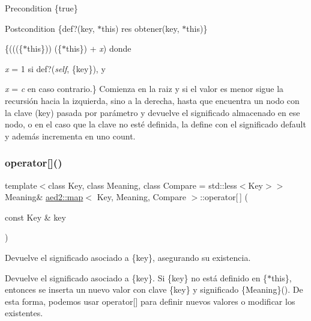 \begin{DoxyPrecond}{Precondition}
\{true\} 
\end{DoxyPrecond}
\begin{DoxyPostcond}{Postcondition}
\{def?(key, $\ast$this)  res  obtener(key, $\ast$this)\}
\end{DoxyPostcond}
\{(((\{$\ast$this\}))  (\{$\ast$this\}) + {\itshape x}) donde
\begin{DoxyItemize}
\item {\itshape x} = 1 si def?({\itshape self}, \{key\}), y
\item {\itshape x} = {\itshape c} en caso contrario.\} Comienza en la raiz y si el valor es menor sigue la recursión hacia la izquierda, sino a la derecha, hasta que encuentra un nodo con la clave (key) pasada por parámetro y devuelve el significado almacenado en ese nodo, o en el caso que la clave no esté definida, la define con el significado default y además incrementa en uno count. 
\end{DoxyItemize}\mbox{\label{classaed2_1_1map_a96f23896164ab47bee48c26b803f9801}} 
\subsubsection{\texorpdfstring{operator[]()}{operator[]()}\hspace{0.1cm}{\footnotesize\ttfamily [2/2]}}
{\footnotesize\ttfamily template$<$class Key, class Meaning, class Compare = std\+::less$<$\+Key$>$$>$ \\
Meaning\& \hyperlink{classaed2_1_1map}{aed2\+::map}$<$ Key, Meaning, Compare $>$\+::operator\mbox{[}$\,$\mbox{]} (\begin{DoxyParamCaption}\item[{const Key \&}]{key }\end{DoxyParamCaption})\hspace{0.3cm}{\ttfamily [inline]}}



Devuelve el significado asociado a \{key\}, asegurando su existencia. 

Devuelve el significado asociado a \{key\}. Si \{key\} no está definido en \{$\ast$this\}, entonces se inserta un nuevo valor con clave \{key\} y significado \{Meaning\}(). De esta forma, podemos usar {\ttfamily operator\mbox{[}\mbox{]}} para definir nuevos valores o modificar los existentes.


